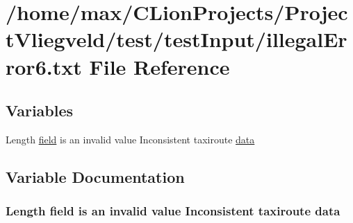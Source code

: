 \hypertarget{illegalError6_8txt}{}\section{/home/max/\+C\+Lion\+Projects/\+Project\+Vliegveld/test/test\+Input/illegal\+Error6.txt File Reference}
\label{illegalError6_8txt}
\subsection*{Variables}
\begin{DoxyCompactItemize}
\item 
Length \hyperlink{illegalError9_8txt_a851dd0136cfc6f6aca977ab0c50e3417}{field} is an invalid value Inconsistent taxiroute \hyperlink{illegalError6_8txt_ae3d48c01716047f83a280725e6a2ab81}{data}
\end{DoxyCompactItemize}


\subsection{Variable Documentation}
\subsubsection[{\texorpdfstring{data}{data}}]{\setlength{\rightskip}{0pt plus 5cm}Length {\bf field} is an invalid value Inconsistent taxiroute data}\hypertarget{illegalError6_8txt_ae3d48c01716047f83a280725e6a2ab81}{}\label{illegalError6_8txt_ae3d48c01716047f83a280725e6a2ab81}
